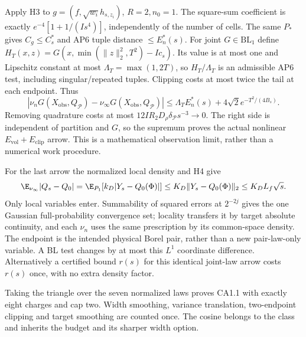 Apply H3 to $g=(f,\sqrt{w_i}h_{s,z_i})$, $R=2,n_0=1$.
The square-sum coefficient is exactly
$e^{-4}[1+1/(Is^4)]$, independently of the number of cells. The same
$P_*$ gives $C_g\le C_s^*$ and AP6 tuple distance $\le E_n^*(s)$.
For joint $G\in\mathrm{BL}_1$ define
$H_T(x,z)=G(x,\min(\|z\|_2^2,T^2)-Ic_s)$.
Its value is at most one and Lipschitz constant at most
$\Lambda_T=\max(1,2T)$, so $H_T/\Lambda_T$ is an admissible AP6 test,
including singular/repeated tuples. Clipping costs at most twice the tail
at each endpoint. Thus
\[
 |\nu_nG(X_{\mathrm{obs}},Q_{\mathcal P})
       -\nu_\infty G(X_{\mathrm{obs}},Q_{\mathcal P})|
 \le\Lambda_T E_n^*(s)+4\sqrt2e^{-T^2/(4B_s)} .
\]
Removing quadrature costs at most
$12IR_2D_\rho\delta_{\mathcal P}s^{-3}\to0$. The right side is independent
of partition and $G$, so the supremum proves the actual nonlinear
$E_{\mathrm{vol}}+E_{\mathrm{clip}}$ arrow. This is a mathematical
observation limit, rather than a numerical work procedure.

For the last arrow the normalized local density and H4 give
\[
 \E_{\nu_\infty}|Q_s-Q_0|
 =\E_{P_1}[k_D|Y_s-Q_0(\Phi)|]
 \le K_D\|Y_s-Q_0(\Phi)\|_2\le K_DL_f\sqrt s.
\]
Only local variables enter. Summability of squared errors at $2^{-2j}$
gives the one Gaussian full-probability convergence set; locality transfers
it by target absolute continuity, and each $\nu_n$ uses the same prescription
by its common-space density. The endpoint is the intended physical Borel
pair, rather than a new pair-law-only variable. A BL test changes by
at most this $L^1$ coordinate difference. Alternatively a certified bound
$r(s)$ for this identical joint-law arrow costs $r(s)$ once, with no
extra density factor.

Taking the triangle over the seven normalized laws proves CA1.1 with
exactly eight charges and cap two. Width smoothing, variance translation,
two-endpoint clipping and target smoothing are counted once. The cosine
belongs to the class and inherits the budget and its sharper width option.

